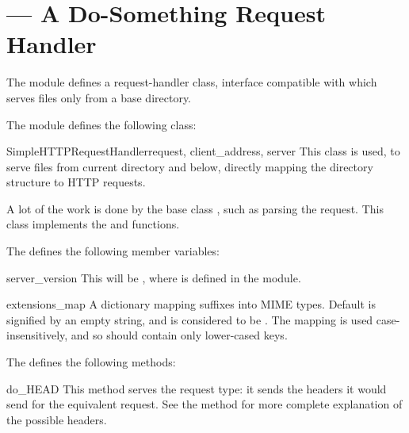 \section{ ---
         A Do-Something Request Handler}



The  module defines a request-handler class,
interface compatible with 
which serves files only from a base directory.

The  module defines the following class:

\begin{classdesc}{SimpleHTTPRequestHandler}{request, client_address, server}
This class is used, to serve files from current directory and below,
directly mapping the directory structure to HTTP requests.

A lot of the work is done by the base class
, such as parsing the
request.  This class implements the  and
 functions.
\end{classdesc}

The  defines the following member
variables:

\begin{memberdesc}{server_version}
This will be , where 
is defined in the module.
\end{memberdesc}

\begin{memberdesc}{extensions_map}
A dictionary mapping suffixes into MIME types. Default is signified
by an empty string, and is considered to be .
The mapping is used case-insensitively, and so should contain only
lower-cased keys.
\end{memberdesc}

The  defines the following methods:

\begin{methoddesc}{do_HEAD}{}
This method serves the  request type: it sends the
headers it would send for the equivalent  request. See the
 method for more complete explanation of the possible
headers.
\end{methoddesc}

